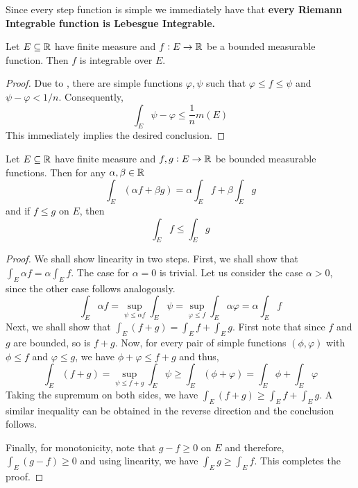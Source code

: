 Since every step function is simple we immediately have that \textbf{every Riemann Integrable function is Lebesgue Integrable.}

\begin{theorem}
    Let $E\subseteq\mathbb{R}$ have finite measure and $f: E\to\mathbb{R}$ be a bounded measurable function. Then $f$ is integrable over $E$.
\end{theorem}
\begin{proof}
    Due to , there are simple functions $\varphi,\psi$ such that $\varphi\le f\le\psi$ and $\psi - \varphi < 1/n$. Consequently, 
    \begin{equation*}
        \int_{E}\psi - \varphi\le\frac{1}{n}m(E)
    \end{equation*}
    This immediately implies the desired conclusion.
\end{proof}

\begin{theorem}
    Let $E\subseteq\mathbb{R}$ have finite measure and $f,g: E\to\mathbb{R}$ be bounded measurable functions. Then for any $\alpha,\beta\in\mathbb{R}$ 
    \begin{equation*}
        \int_E(\alpha f + \beta g) = \alpha\int_E f + \beta\int_E g
    \end{equation*}
    and if $f\le g$ on $E$, then 
    \begin{equation*}
        \int_E f\le\int_E g
    \end{equation*}
\end{theorem}
\begin{proof}
    We shall show linearity in two steps. First, we shall show that $\int_E\alpha f = \alpha\int_E f$. The case for $\alpha = 0$ is trivial. Let us consider the case $\alpha > 0$, since the other case follows analogously.
    \begin{equation*}
        \int_E\alpha f = \sup_{\psi\le\alpha f}\int_E\psi = \sup_{\varphi\le f}\int_E\alpha\varphi = \alpha\int_E f
    \end{equation*}
    Next, we shall show that $\int_E (f + g) = \int_E f + \int_E g$. First note that since $f$ and $g$ are bounded, so is $f + g$. Now, for every pair of simple functions $(\phi,\varphi)$ with $\phi\le f$ and $\varphi\le g$, we have $\phi + \varphi\le f+ g$ and thus,
    \begin{equation*}
        \int_E (f + g) = \sup_{\psi\le f+ g}\int_E\psi\ge\int_E(\phi+\varphi) = \int_E\phi + \int_E\varphi
    \end{equation*}
    Taking the supremum on both sides, we have $\int_E (f + g)\ge\int_E f + \int_E g$. A similar inequality can be obtained in the reverse direction and the conclusion follows.

    Finally, for monotonicity, note that $g - f\ge 0$ on $E$ and therefore, $\int_E(g - f)\ge 0$ and using linearity, we have $\int_E g\ge\int_E f$. This completes the proof.
\end{proof}

